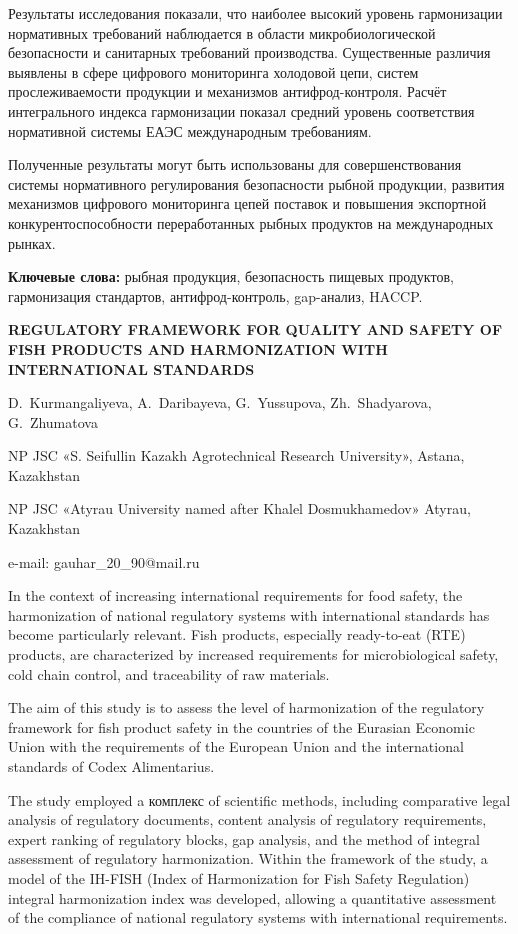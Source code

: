 Результаты исследования показали, что наиболее высокий уровень
гармонизации нормативных требований наблюдается в области
микробиологической безопасности и санитарных требований производства.
Существенные различия выявлены в сфере цифрового мониторинга холодовой
цепи, систем прослеживаемости продукции и механизмов антифрод-контроля.
Расчёт интегрального индекса гармонизации показал средний уровень
соответствия нормативной системы ЕАЭС международным требованиям.

Полученные результаты могут быть использованы для совершенствования
системы нормативного регулирования безопасности рыбной продукции,
развития механизмов цифрового мониторинга цепей поставок и повышения
экспортной конкурентоспособности переработанных рыбных продуктов на
международных рынках.

{\bfseries Ключевые слова:} рыбная продукция, безопасность пищевых
продуктов, гармонизация стандартов, антифрод-контроль, gap-анализ,
HACCP.

\begin{header}
{\bfseries REGULATORY FRAMEWORK FOR QUALITY AND SAFETY OF FISH PRODUCTS AND HARMONIZATION WITH INTERNATIONAL STANDARDS}

D.~Kurmangaliyeva,
A.~Daribayeva,
G.~Yussupova\envelope,
Zh.~Shadyarova,
G.~Zhumatova
\end{header}

\begin{affil}
NP JSC «S. Seifullin Kazakh Agrotechnical Research University», Astana, Kazakhstan

NP JSC «Atyrau University named after Khalel Dosmukhamedov» Atyrau, Kazakhstan

e-mail: gauhar\_20\_90@mail.ru
\end{affil}

In the context of increasing international requirements for food safety,
the harmonization of national regulatory systems with international
standards has become particularly relevant. Fish products, especially
ready-to-eat (RTE) products, are characterized by increased requirements
for microbiological safety, cold chain control, and traceability of raw
materials.

The aim of this study is to assess the level of harmonization of the
regulatory framework for fish product safety in the countries of the
Eurasian Economic Union with the requirements of the European Union and
the international standards of Codex Alimentarius.

The study employed a комплекс of scientific methods, including
comparative legal analysis of regulatory documents, content analysis of
regulatory requirements, expert ranking of regulatory blocks, gap
analysis, and the method of integral assessment of regulatory
harmonization. Within the framework of the study, a model of the IH-FISH
(Index of Harmonization for Fish Safety Regulation) integral
harmonization index was developed, allowing a quantitative assessment of
the compliance of national regulatory systems with international
requirements.

